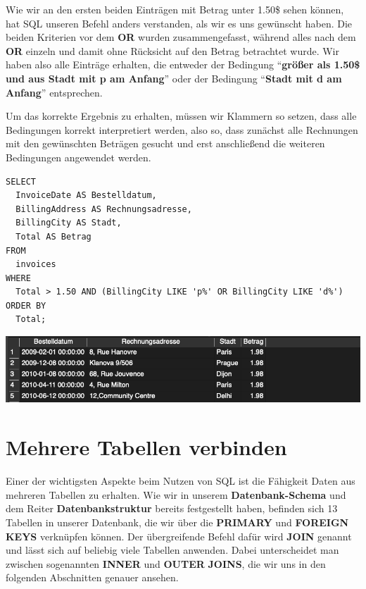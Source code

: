\documentclass[
]{book}
\begin{document}
Wie wir an den ersten beiden Einträgen mit Betrag unter 1.50\$ sehen können, hat SQL unseren Befehl anders verstanden, als wir es uns gewünscht haben. Die beiden Kriterien vor dem \textbf{OR} wurden zusammengefasst, während alles nach dem \textbf{OR} einzeln und damit ohne Rücksicht auf den Betrag betrachtet wurde.
Wir haben also alle Einträge erhalten, die entweder der Bedingung ``\textbf{größer als 1.50\$ und aus Stadt mit p am Anfang}'' oder der Bedingung ``\textbf{Stadt mit d am Anfang}'' entsprechen.

Um das korrekte Ergebnis zu erhalten, müssen wir Klammern so setzen, dass alle Bedingungen korrekt interpretiert werden, also so, dass zunächst alle Rechnungen mit den gewünschten Beträgen gesucht und erst anschließend die weiteren Bedingungen angewendet werden.

\begin{verbatim}
SELECT
  InvoiceDate AS Bestelldatum,
  BillingAddress AS Rechnungsadresse,
  BillingCity AS Stadt,
  Total AS Betrag
FROM
  invoices
WHERE
  Total > 1.50 AND (BillingCity LIKE 'p%' OR BillingCity LIKE 'd%')
ORDER BY
  Total;
\end{verbatim}

\includegraphics[width=10.41667in,height=\textheight]{img-WHERE7.png}

\hypertarget{mehrere-tabellen-verbinden}{%
\chapter{Mehrere Tabellen verbinden}\label{mehrere-tabellen-verbinden}}

Einer der wichtigsten Aspekte beim Nutzen von SQL ist die Fähigkeit Daten aus mehreren Tabellen zu erhalten. Wie wir in unserem \textbf{Datenbank-Schema} und dem Reiter \textbf{Datenbankstruktur} bereits festgestellt haben, befinden sich 13 Tabellen in unserer Datenbank, die wir über die \textbf{PRIMARY} und \textbf{FOREIGN KEYS} verknüpfen können. Der übergreifende Befehl dafür wird \textbf{JOIN} genannt und lässt sich auf beliebig viele Tabellen anwenden. Dabei unterscheidet man zwischen sogenannten \textbf{INNER} und \textbf{OUTER} \textbf{JOINS}, die wir uns in den folgenden Abschnitten genauer ansehen.
\end{document}
